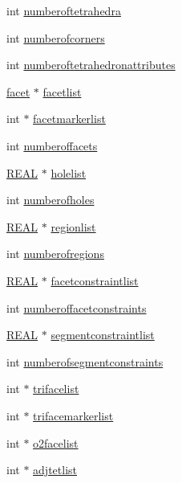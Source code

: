 \begin{DoxyCompactItemize}
int \hyperlink{classtetgenio_ad9a3fc307214cd459ca367c55d4bc16d}{numberoftetrahedra}
\item 
int \hyperlink{classtetgenio_a7d31410cbdcf2c1557ae7c1148c2eed7}{numberofcorners}
\item 
int \hyperlink{classtetgenio_ac22e481bf9a3662b173599914a696f7a}{numberoftetrahedronattributes}
\item 
\hyperlink{structtetgenio_1_1facet}{facet} $\ast$ \hyperlink{classtetgenio_ad65489b9aece6ba14ff8e3c89f533ced}{facetlist}
\item 
int $\ast$ \hyperlink{classtetgenio_a0d5d9d0718980f8e9d4ecc3e771abba0}{facetmarkerlist}
\item 
int \hyperlink{classtetgenio_af1cb1515751c9cd0497abba62da8790d}{numberoffacets}
\item 
\hyperlink{tetgen_8h_a4b654506f18b8bfd61ad2a29a7e38c25}{R\+E\+AL} $\ast$ \hyperlink{classtetgenio_a395bd7fc3f66dd013efd5176a0d54265}{holelist}
\item 
int \hyperlink{classtetgenio_ad12a46036cd44a7a646228d5471b51ac}{numberofholes}
\item 
\hyperlink{tetgen_8h_a4b654506f18b8bfd61ad2a29a7e38c25}{R\+E\+AL} $\ast$ \hyperlink{classtetgenio_a74b5593324c79ad60d9bb0951afb2b41}{regionlist}
\item 
int \hyperlink{classtetgenio_a0394c99b57c4412515183ada3c1d8951}{numberofregions}
\item 
\hyperlink{tetgen_8h_a4b654506f18b8bfd61ad2a29a7e38c25}{R\+E\+AL} $\ast$ \hyperlink{classtetgenio_aabfef9df7956218bcb98ee39f1a9814b}{facetconstraintlist}
\item 
int \hyperlink{classtetgenio_acd7176cc55338187a391016acfb53913}{numberoffacetconstraints}
\item 
\hyperlink{tetgen_8h_a4b654506f18b8bfd61ad2a29a7e38c25}{R\+E\+AL} $\ast$ \hyperlink{classtetgenio_ab63298ebb6904d1dfa8ddebb13440ef7}{segmentconstraintlist}
\item 
int \hyperlink{classtetgenio_a56142dec4914ffaaf5093c4aaa23b7d4}{numberofsegmentconstraints}
\item 
int $\ast$ \hyperlink{classtetgenio_a25e290684bfb26d4d9b5e67059c572e2}{trifacelist}
\item 
int $\ast$ \hyperlink{classtetgenio_a22a2e0937d0da63a2fda26fc1671b32f}{trifacemarkerlist}
\item 
int $\ast$ \hyperlink{classtetgenio_aad1e2f66ad5c438fb2bee5d510fdca19}{o2facelist}
\item 
int $\ast$ \hyperlink{classtetgenio_a44f7eb61256dfb95d2fa2bdb91ea3718}{adjtetlist}

\end{DoxyCompactItemize}
